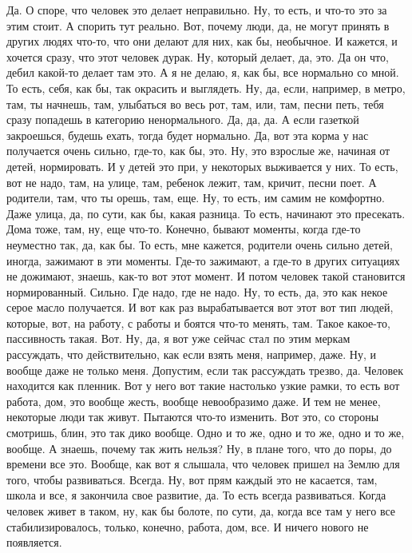 Да. О споре, что человек
это делает неправильно. Ну, то есть, и что-то
это за этим стоит. А спорить
тут реально. Вот, почему люди, да, не
могут принять в других людях
что-то, что они делают для них, как бы,
необычное. И кажется, и хочется
сразу, что этот человек дурак. Ну, который
делает, да, это. Да он что,
дебил какой-то делает там это.
А я не делаю,
я, как бы, все нормально со мной.
То есть, себя, как бы, так
окрасить и выглядеть. Ну, да, если, например,
в метро, там, ты начнешь, там, улыбаться
во весь рот, там, или, там, песни петь,
тебя сразу попадешь
в категорию ненормального. Да, да, да.
А если газеткой закроешься,
будешь ехать, тогда будет нормально.
Да, вот эта
корма у нас получается очень сильно,
где-то, как бы, это.
Ну, это взрослые же, начиная от детей,
нормировать. И у детей это при,
у некоторых
выживается у них. То есть,
вот не надо, там, на улице, там,
ребенок лежит, там, кричит, песни
поет. А родители, там, что ты орешь,
там, еще. Ну, то есть, им самим не комфортно.
Даже улица, да, по сути, как бы, какая разница.
То есть, начинают
это пресекать. Дома тоже, там, ну,
еще что-то. Конечно, бывают моменты, когда
где-то неуместно так, да, как бы.
То есть, мне кажется, родители очень сильно
детей, иногда, зажимают
в эти моменты. Где-то зажимают,
а где-то в других ситуациях
не дожимают, знаешь, как-то
вот этот момент. И потом человек такой
становится нормированный.
Сильно. Где надо, где не надо.
Ну, то есть, да, это как
некое серое масло получается.
И вот как раз вырабатывается
вот этот вот
тип людей, которые, вот, на работу, с работы
и боятся что-то менять, там.
Такое какое-то, пассивность такая.
Вот.
Ну, да, я вот уже сейчас
стал по этим меркам
рассуждать, что действительно,
как если взять меня,
например, даже.
Ну, и вообще даже
не только меня.
Допустим, если так рассуждать
трезво, да.
Человек находится как пленник.
Вот у него вот такие настолько
узкие рамки, то есть вот работа, дом,
это вообще жесть, вообще
невообразимо даже.
И тем не менее, некоторые люди так живут.
Пытаются
что-то изменить.
Вот это, со стороны смотришь,
блин, это так дико вообще.
Одно и то же, одно и то же,
одно и то же, вообще.
А знаешь, почему так жить нельзя?
Ну, в плане того, что до поры,
до времени все это.
Вообще, как вот я слышала, что человек пришел
на Землю для того, чтобы развиваться.
Всегда. Ну, вот прям каждый
это не касается, там, школа и все,
я закончила свое развитие, да.
То есть всегда развиваться.
Когда человек живет в таком, ну, как бы болоте,
по сути, да, когда все там у него все стабилизировалось,
только, конечно, работа, дом, все.
И ничего нового не появляется.

